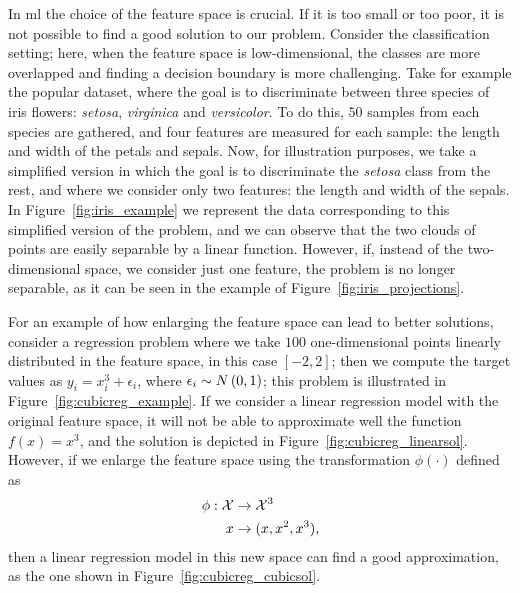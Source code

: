 In \acrshort{ml} the choice of the feature space is crucial. If it is too small or too poor, it is not possible to find a good solution to our problem.
Consider the classification setting; here, when the feature space is low-dimensional, the classes are more overlapped and finding a decision boundary is more challenging. 
%
Take for example the popular  dataset, where the goal is to discriminate between three species of iris flowers: \emph{setosa}, \emph{virginica} and \emph{versicolor}. To do this, $50$ samples from each species are gathered, and four features are measured for each sample: the length and width of the petals and sepals.
%
Now, for illustration purposes, we take a simplified version in which the goal is to discriminate the \emph{setosa} class from the rest, and where we consider only two features: the length and width of the sepals. In Figure~\ref{fig:iris_example} we represent the data corresponding to this simplified version of the  problem, and we can observe that the two clouds of points are easily separable by a linear function. However, if, instead of the two-dimensional space, we consider just one feature, the problem is no longer separable, as it can be seen in the example of Figure~\ref{fig:iris_projections}.
%

For an example of how enlarging the feature space can lead to better solutions, consider a regression problem where we take $100$ one-dimensional points linearly distributed in the feature space, in this case $[-2, 2]$; then we compute the target values as $y_i = x_i^3 + \epsilon_i$, where $\epsilon_i \sim N \left(0, 1\right)$; this problem is illustrated in Figure~\ref{fig:cubicreg_example}. If we consider a linear regression model with the original feature space, it will not be able to approximate well the function $f(x)=x^3$, and the solution is depicted in Figure~\ref{fig:cubicreg_linearsol}.
However, if we enlarge the feature space using the transformation $\phi(\cdot)$ defined as
\begin{equation}
    \begin{aligned}
        \nonumber
        \phi:\mathcal{X} &\to\mathcal{X}^3 \\
        x &\to (x, x^2, x^3) ,
    \end{aligned}
\end{equation}
then a linear regression model in this new space can find a good approximation, as the one shown in Figure~\ref{fig:cubicreg_cubicsol}.
%



